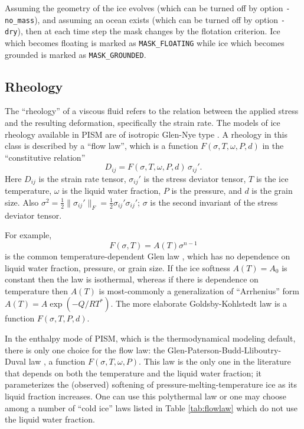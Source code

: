 Assuming the geometry of the ice evolves (which can be turned off by option \texttt{-no_mass}), and assuming an ocean exists (which can be turned off by option \texttt{-dry}), then at each time step the mask changes by the flotation criterion.  Ice which becomes floating is marked as \texttt{MASK_FLOATING} while ice which becomes grounded is marked as \texttt{MASK_GROUNDED}.


\subsection{Rheology}
\label{sec:rheology}

The ``rheology'' of a viscous fluid refers to the relation between the applied stress and the resulting deformation, specifically the strain rate.  The models of ice rheology available in PISM are of isotropic Glen-Nye type \cite{Paterson}.   A rheology in this class is described by a ``flow law'', which is a function $F(\sigma,T,\omega,P,d)$ in the ``constitutive relation''
\begin{equation}
D_{ij} = F(\sigma,T,\omega,P,d)\, \sigma_{ij}'.  \label{eq:constitutive}
\end{equation}
Here $D_{ij}$ is the strain rate tensor, $\sigma_{ij}'$ is the stress deviator tensor, $T$ is the ice temperature, $\omega$ is the liquid water fraction, $P$ is the pressure, and $d$ is the grain size.  Also $\sigma^2 = \frac{1}{2} \|\sigma_{ij}'\|_F = \frac{1}{2} \sigma_{ij}' \sigma_{ij}'$; $\sigma$ is the second invariant of the stress deviator tensor.

For example,
\begin{equation}
F(\sigma,T) = A(T) \sigma^{n-1}  \label{eq:isothermalglen}
\end{equation}
is the common temperature-dependent Glen law \cite{PatersonBudd,BBL}, which has no dependence on liquid water fraction, pressure, or grain size.  If the ice softness $A(T)=A_0$ is constant then the law is isothermal, whereas if there is dependence on temperature then $A(T)$ is most-commonly a generalization of ``Arrhenius'' form $A(T) = A \exp(-Q/RT^*)$.  The more elaborate Goldsby-Kohlstedt law \cite{GoldsbyKohlstedt} is a function $F(\sigma,T,P,d)$.

In the enthalpy mode of PISM, which is the thermodynamical modeling default, there is only one choice for the flow law: the Glen-Paterson-Budd-Lliboutry-Duval law \cite{AschwandenBuelerKhroulevBlatter,LliboutryDuval1985,PatersonBudd}, a function $F(\sigma,T,\omega,P)$.  This law is the only one in the literature that depends on both the temperature and the liquid water fraction; it parameterizes the (observed) softening of pressure-melting-temperature ice as its liquid fraction increases.  One can use this polythermal law or one may choose among a number of ``cold ice'' laws listed in Table \ref{tab:flowlaw} which do not use the liquid water fraction.  

